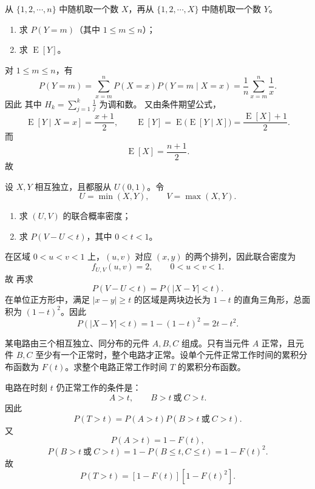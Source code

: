 ﻿

\begin{question}
从 $\{1,2,\cdots,n\}$ 中随机取一个数 $X$，再从 $\{1,2,\cdots,X\}$ 中随机取一个数 $Y$。
\begin{enumerate}
\item 求 $P(Y=m)$（其中 $1\le m\le n$）；
\item 求 $\operatorname{E}[Y]$。
\end{enumerate}
\begin{solution}
对 $1\le m\le n$，有
\[
P(Y=m)=\sum_{x=m}^{n}P(X=x)P(Y=m\mid X=x)
=\frac1n\sum_{x=m}^{n}\frac1x.
\]
因此
其中 $H_k=\sum_{j=1}^k\frac1j$ 为调和数。
又由条件期望公式，
\[
\operatorname{E}[Y\mid X=x]=\frac{x+1}{2},
\qquad
\operatorname{E}[Y]=\operatorname{E}\bigl(\operatorname{E}[Y\mid X]\bigr)=\frac{\operatorname{E}[X]+1}{2}.
\]
而
\[
\operatorname{E}[X]=\frac{n+1}{2}.
\]
故
\end{solution}
\end{question}

\begin{question}
设 $X,Y$ 相互独立，且都服从 $U(0,1)$。令
\[
U=\min(X,Y),\qquad V=\max(X,Y).
\]
\begin{enumerate}
\item 求 $(U,V)$ 的联合概率密度；
\item 求 $P(V-U<t)$，其中 $0<t<1$。
\end{enumerate}
\begin{solution}
在区域 $0<u<v<1$ 上，$(u,v)$ 对应 $(x,y)$ 的两个排列，因此联合密度为
\[
f_{U,V}(u,v)=2,
\qquad 0<u<v<1.
\]
故
再求
\[
P(V-U<t)=P(|X-Y|<t).
\]
在单位正方形中，满足 $|x-y|\ge t$ 的区域是两块边长为 $1-t$ 的直角三角形，总面积为 $(1-t)^2$。因此
\[
P(|X-Y|<t)=1-(1-t)^2=2t-t^2.
\]
\end{solution}
\end{question}

\begin{question}
某电路由三个相互独立、同分布的元件 $A,B,C$ 组成。只有当元件 $A$ 正常，且元件 $B,C$ 至少有一个正常时，整个电路才正常。设单个元件正常工作时间的累积分布函数为 $F(t)$。求整个电路正常工作时间 $T$ 的累积分布函数。
\begin{solution}
电路在时刻 $t$ 仍正常工作的条件是：
\[
A>t,\qquad B>t\ \text{或}\ C>t.
\]
因此
\[
P(T>t)=P(A>t)P(B>t\ \text{或}\ C>t).
\]
又
\[
P(A>t)=1-F(t),
\]
\[
P(B>t\ \text{或}\ C>t)=1-P(B\le t,C\le t)=1-F(t)^2.
\]
故
\[
P(T>t)=[1-F(t)][1-F(t)^2].
\]
\end{solution}
\end{question}

